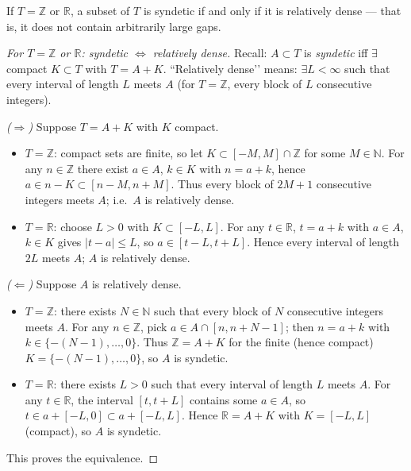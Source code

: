 If $T = \mathbb{Z}$ or $\mathbb{R}$, a subset of $T$ is syndetic if and only if it is relatively dense — that is, it does not contain arbitrarily large gaps.
\begin{mynote}
    \begin{proof}[For $T=\mathbb Z$ or $\mathbb R$: syndetic $\iff$ relatively dense]
        Recall: $A\subset T$ is \emph{syndetic} iff $\exists$ compact $K\subset T$ with $T=A+K$.
        “Relatively dense’’ means: $\exists L<\infty$ such that every interval of length $L$ meets $A$
        (for $T=\mathbb Z$, every block of $L$ consecutive integers).

        \emph{($\Rightarrow$)} Suppose $T=A+K$ with $K$ compact.
        \begin{itemize}
            \item $T=\mathbb Z$: compact sets are finite, so let $K\subset[-M,M]\cap\mathbb Z$ for some $M\in\mathbb N$.
                  For any $n\in\mathbb Z$ there exist $a\in A$, $k\in K$ with $n=a+k$, hence
                  $a\in n-K\subset[n-M,n+M]$. Thus every block of $2M{+}1$ consecutive integers meets $A$;
                  i.e.\ $A$ is relatively dense.
            \item $T=\mathbb R$: choose $L>0$ with $K\subset[-L,L]$. For any $t\in\mathbb R$,
                  $t=a+k$ with $a\in A$, $k\in K$ gives $|t-a|\le L$, so $a\in[t-L,t+L]$.
                  Hence every interval of length $2L$ meets $A$; $A$ is relatively dense.
        \end{itemize}

        \emph{($\Leftarrow$)} Suppose $A$ is relatively dense.
        \begin{itemize}
            \item $T=\mathbb Z$: there exists $N\in\mathbb N$ such that every block of $N$ consecutive integers meets $A$.
                  For any $n\in\mathbb Z$, pick $a\in A\cap[n,n+N-1]$; then $n=a+k$ with $k\in\{-(N-1),\ldots,0\}$.
                  Thus $\mathbb Z=A+K$ for the finite (hence compact) $K=\{-(N-1),\ldots,0\}$, so $A$ is syndetic.
            \item $T=\mathbb R$: there exists $L>0$ such that every interval of length $L$ meets $A$.
                  For any $t\in\mathbb R$, the interval $[t,t+L]$ contains some $a\in A$, so $t\in a+[-L,0]\subset a+[-L,L]$.
                  Hence $\mathbb R=A+K$ with $K=[-L,L]$ (compact), so $A$ is syndetic.
        \end{itemize}
        This proves the equivalence.
    \end{proof}
\end{mynote}


